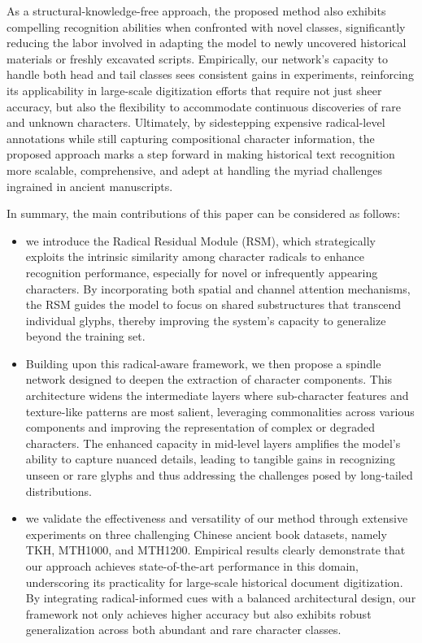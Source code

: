 As a structural-knowledge-free approach, the proposed method also exhibits compelling recognition abilities when confronted with novel classes, significantly reducing the labor involved in adapting the model to newly uncovered historical materials or freshly excavated scripts. Empirically, our network's capacity to handle both head and tail classes sees consistent gains in experiments, reinforcing its applicability in large-scale digitization efforts that require not just sheer accuracy, but also the flexibility to accommodate continuous discoveries of rare and unknown characters. Ultimately, by sidestepping expensive radical-level annotations while still capturing compositional character information, the proposed approach marks a step forward in making historical text recognition more scalable, comprehensive, and adept at handling the myriad challenges ingrained in ancient manuscripts.

In summary, the main contributions of this paper can be considered as follows:
\begin{itemize}
\item we introduce the Radical Residual Module (RSM), which strategically exploits the intrinsic similarity among character radicals to enhance recognition performance, especially for novel or infrequently appearing characters. By incorporating both spatial and channel attention mechanisms, the RSM guides the model to focus on shared substructures that transcend individual glyphs, thereby improving the system’s capacity to generalize beyond the training set. 
\item Building upon this radical-aware framework, we then propose a spindle network designed to deepen the extraction of character components. This architecture widens the intermediate layers where sub-character features and texture-like patterns are most salient, leveraging commonalities across various components and improving the representation of complex or degraded characters. The enhanced capacity in mid-level layers amplifies the model’s ability to capture nuanced details, leading to tangible gains in recognizing unseen or rare glyphs and thus addressing the challenges posed by long-tailed distributions. 
\item we validate the effectiveness and versatility of our method through extensive experiments on three challenging Chinese ancient book datasets, namely TKH, MTH1000, and MTH1200. Empirical results clearly demonstrate that our approach achieves state-of-the-art performance in this domain, underscoring its practicality for large-scale historical document digitization. By integrating radical-informed cues with a balanced architectural design, our framework not only achieves higher accuracy but also exhibits robust generalization across both abundant and rare character classes.
\end{itemize}

